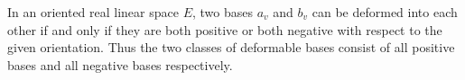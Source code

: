 In an oriented real linear space $E$, two bases $a_v$ and $b_v$ can be deformed into each other if and only if they are both positive or both negative with respect to the given orientation. Thus the two classes of deformable bases consist of all positive bases and all negative bases respectively.
